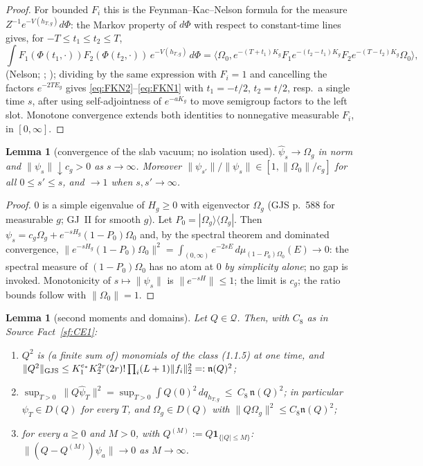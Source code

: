 \documentclass[11pt,a4paper]{article}
\theoremstyle{plain}
\newtheorem{lemma}[theorem]{Lemma}
\theoremstyle{definition}
\newcommand{\Om}{\Omega}
\newcommand{\Q}{\mathcal{Q}}
\newcommand{\ip}[2]{\langle #1,#2\rangle}
\begin{document}
\begin{proof}
For bounded $F_i$ this is the Feynman--Kac--Nelson formula for the measure
$Z^{-1}e^{-V(h_{T,g})}d\Phi$: the Markov property of $d\Phi$ with respect to constant-time lines
gives, for $-T\le t_1\le t_2\le T$,
\[
  \int F_1(\Phi(t_1,\cdot))F_2(\Phi(t_2,\cdot))\,e^{-V(h_{T,g})}\,d\Phi
  =\ip{\Om_0}{e^{-(T+t_1)K_g}F_1e^{-(t_2-t_1)K_g}F_2e^{-(T-t_2)K_g}\Om_0},
\]
(Nelson; \cite[Thm.~III.12]{SimonBook}; \cite{GRS75}); dividing by the same expression with
$F_i=1$ and cancelling the factors $e^{-2TE_g}$ gives \eqref{eq:FKN2}--\eqref{eq:FKN1} with
$t_1=-t/2$, $t_2=t/2$, resp.\ a single time $s$, after using self-adjointness of $e^{-aK_g}$ to
move semigroup factors to the left slot. Monotone convergence extends both identities to
nonnegative measurable $F_i$, in $[0,\infty]$.
\end{proof}

\begin{lemma}[convergence of the slab vacuum; no isolation used]\label{lem:vac}
$\hat\psi_s\to\Om_g$ in norm and $\|\psi_s\|\downarrow c_g>0$ as $s\to\infty$. Moreover
$\|\psi_{s'}\|/\|\psi_s\|\in[1,\|\Om_0\|/c_g]$ for all $0\le s'\le s$, and
$\to1$ when $s,s'\to\infty$.
\end{lemma}

\begin{proof}
$0$ is a simple eigenvalue of $H_g\ge0$ with eigenvector $\Om_g$ (GJS p.~588 for measurable $g$;
GJ~II for smooth $g$). Let $P_0=|\Om_g\rangle\langle\Om_g|$. Then
$\psi_s=c_g\Om_g+e^{-sH_g}(1-P_0)\Om_0$ and, by the spectral theorem and dominated convergence,
$\|e^{-sH_g}(1-P_0)\Om_0\|^2=\int_{(0,\infty)}e^{-2sE}\,d\mu_{(1-P_0)\Om_0}(E)\to0$: the spectral
measure of $(1-P_0)\Om_0$ has no atom at $0$ \emph{by simplicity alone}; no gap is invoked.
Monotonicity of $s\mapsto\|\psi_s\|$ is $\|e^{-sH}\|\le1$; the limit is $c_g$; the ratio bounds
follow with $\|\Om_0\|=1$.
\end{proof}

\begin{lemma}[second moments and domains]\label{lem:moments}
Let $Q\in\Q$. Then, with $C_8$ as in Source Fact~\ref{sf:CE1}:
\begin{enumerate}
\item[\rm(i)] $Q^2$ is (a finite sum of) monomials of the class (1.1.5) at one time, and
      $\|Q^2\|_{\rm GJS}\le K_1^{e_*}K_2^{2r}(2r)!\prod_i(L+1)\|f_i\|_2^2=:\mathfrak n(Q)^2$;
\item[\rm(ii)] $\displaystyle\sup_{T>0}\ \|Q\hat\psi_T\|^2
      =\sup_{T>0}\int Q(0)^2\,dq_{h_{T,g}}\ \le\ C_8\,\mathfrak n(Q)^2$;
      in particular $\psi_T\in D(Q)$ for every $T$, and $\Om_g\in D(Q)$ with
      $\|Q\Om_g\|^2\le C_8\mathfrak n(Q)^2$;
\item[\rm(iii)] for every $a\ge0$ and $M>0$, with $Q^{(M)}:=Q\mathbf 1_{\{|Q|\le M\}}$:
      $\|(Q-Q^{(M)})\psi_a\|\to0$ as $M\to\infty$.
\end{enumerate}
\end{lemma}
\end{document}
